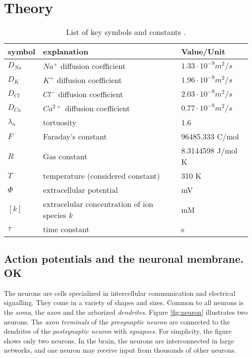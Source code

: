 \documentclass{article}
\begin{document}
\section{Theory}
\begin{table}[h!]
  \centering
  \caption{List of key symbols and constants \cite{Halnes2016}.}
  \label{tab:constants}
  \begin{tabular}{l||l|l}
symbol & explanation & Value/Unit \\
\hline
$D_{Na}$  & $Na^+$ diffusion coefficient & $1.33\cdot 10^{-9}m^2/s$  \\
$D_{K}$  & $K^+$ diffusion coefficient & $1.96\cdot 10^{-9}m^2/s$  \\
$D_{Cl}$  & $Cl^-$ diffusion coefficient & $2.03\cdot 10^{-9}m^2/s$  \\
$D_{Ca}$  & $Ca^{2+}$ diffusion coefficient & $0.77\cdot 10^{-9}m^2/s$  \\
$\lambda_n$ & tortuosity & 1.6 \\
$F$ & Faraday's constant & 	96485.333 C/mol \\ 
$R$ & Gas constant & 8.3144598 J/mol K\\
$T$ & temperature (considered constant)& 310 K\\
\hline
$\Phi$ & extracellular potential & mV \\
$[k]$ & extracelular concentration of ion species $k$ & mM \\
$\tau$ & time constant & s\\
 \end{tabular}
\end{table}

\subsection{Action potentials and the neuronal membrane. OK}\label{APs,neuronal membrane, el.neutrality}
The neurons are cells specialized in intercellular communication and electrical signalling. They come in a variety of shapes and sizes. Common to all neurons is the \textit{soma}, the \textit{axon} and the arborized \textit{dendrites}. Figure  \ref{fig:neuron} illustrates two neurons. The \textit{axon terminals} of the \textit{presynaptic neuron} are connected to the dendrites of the \textit{postsynaptic neuron} with \textit{synapses}. For simplicity, the figure shows only two neurons. In the brain, the neurons are interconnected in large networks, and one neuron may receive input from thousands of other neurons.
  
\end{document}
